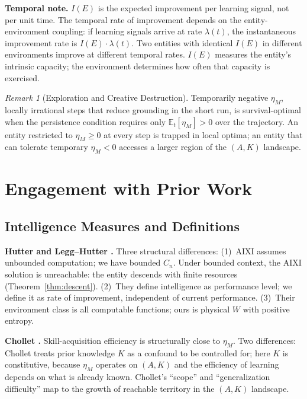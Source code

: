 \documentclass[11pt]{article}
\theoremstyle{definition}
\theoremstyle{remark}
\newtheorem{remark}{Remark}
\begin{document}
\textbf{Temporal note.} $I(E)$ is the expected improvement per learning
signal, not per unit time. The temporal rate of improvement depends on
the entity-environment coupling: if learning signals arrive at rate
$\lambda(t)$, the instantaneous improvement rate is
$I(E) \cdot \lambda(t)$. Two entities with identical $I(E)$ in different
environments improve at different temporal rates. $I(E)$ measures the
entity's intrinsic capacity; the environment determines how often that
capacity is exercised.

\begin{remark}[Exploration and Creative Destruction]
\label{rem:exploration}
Temporarily negative $\eta_M$, locally irrational steps that reduce
grounding in the short run, is survival-optimal when the persistence
condition requires only $\mathbb{E}_t[\eta_M] > 0$ over the trajectory.
An entity restricted to $\eta_M \geq 0$ at every step is trapped in
local optima; an entity that can tolerate temporary $\eta_M < 0$
accesses a larger region of the $(A, K)$ landscape.
\end{remark}

\section{Engagement with Prior Work}
\label{sec:prior}

\subsection{Intelligence Measures and Definitions}

\textbf{Hutter \cite{Hutter2005} and Legg--Hutter \cite{LeggHutter2007}.}
Three structural differences: (1)~AIXI assumes unbounded computation;
we have bounded $C_n$. Under bounded context, the AIXI solution is
unreachable: the entity descends with finite resources
(Theorem~\ref{thm:descent}). (2)~They define intelligence as
performance level; we define it as rate of improvement, independent of
current performance. (3)~Their environment class is all computable
functions; ours is physical $W$ with positive entropy.

\textbf{Chollet \cite{Chollet2019}.}
Skill-acquisition efficiency is structurally close to $\eta_M$. Two
differences: Chollet treats prior knowledge $K$ as a confound to be
controlled for; here $K$ is constitutive, because $\eta_M$ operates
on $(A, K)$ and the efficiency of learning depends on what is already
known. Chollet's ``scope'' and ``generalization difficulty'' map to the
growth of reachable territory in the $(A, K)$ landscape.
\end{document}
